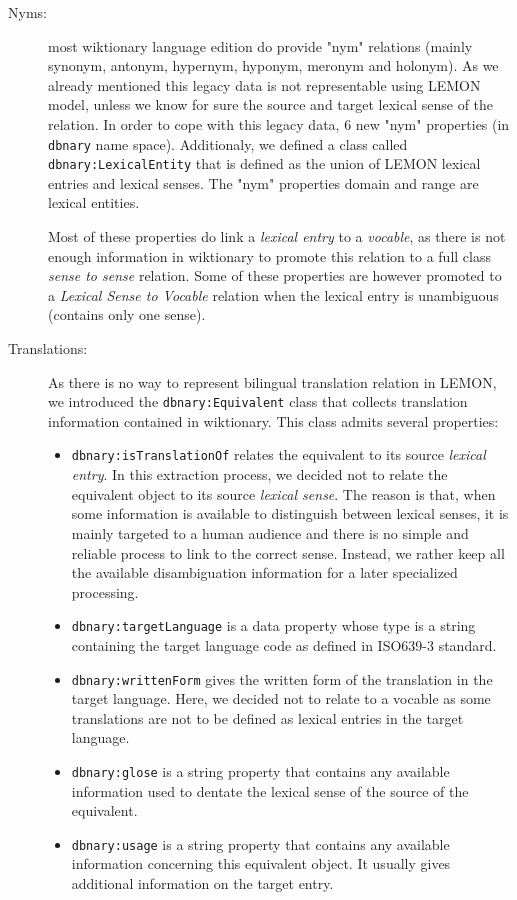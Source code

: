\documentclass[10pt, a4paper]{article}
\begin{document}
\begin{description}
\item[Nyms:] most wiktionary language edition do provide "nym" relations (mainly synonym, antonym, hypernym, hyponym, meronym and holonym). As we already mentioned this legacy data is not representable using LEMON model, unless we know for sure the source and target lexical sense of the relation. In order to cope with this legacy data, 6 new "nym" properties (in \texttt{dbnary} name space). Additionaly, we defined a class called \texttt{dbnary:LexicalEntity} that is defined as the union of LEMON lexical entries and lexical senses. The "nym" properties domain and range are lexical entities. 

Most of these properties do link a \textit{lexical entry} to a \textit{vocable}, as there is not enough information in wiktionary to promote this relation to a full class \textit{sense to sense} relation. Some of these properties are however promoted to a \textit{Lexical Sense to Vocable} relation when the lexical entry is unambiguous (contains only one sense).
\item[Translations:] As there is no way to represent bilingual translation relation in LEMON, we introduced the \texttt{dbnary:Equivalent} class that collects translation information contained in wiktionary. This class admits several properties:
\begin{itemize}
\item \texttt{dbnary:isTranslationOf} relates the equivalent to its source \textit{lexical entry}. In this extraction process, we decided not to relate the equivalent object to its source \textit{lexical sense}. The reason is that, when some information is available to distinguish between lexical senses, it is mainly targeted to a human audience and there is no simple and reliable process to  link to the correct sense. Instead, we rather keep all the available disambiguation information for a later specialized processing.
\item \texttt{dbnary:targetLanguage} is a data property whose type is a string containing the target language code as defined in ISO639-3 standard.
\item \texttt{dbnary:writtenForm} gives the written form of the translation in the target language. Here, we decided not to relate to a vocable as some translations are not to be defined as lexical entries in the target language.
\item \texttt{dbnary:glose} is a string property that contains any available information used to dentate the lexical sense of the source of the equivalent.
\item \texttt{dbnary:usage} is a string property that contains any available information concerning this equivalent object. It usually gives additional information on the target entry.
\end{itemize}

\end{description}
\end{document}
